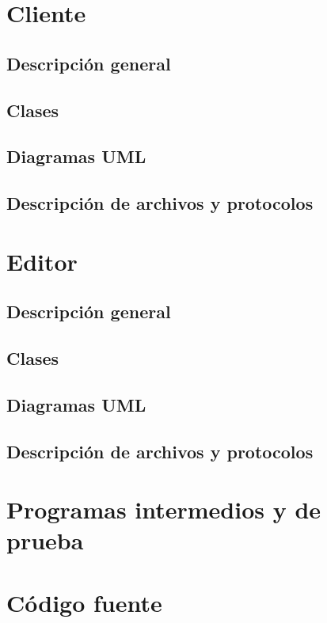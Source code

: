 \documentclass[a4paper]{article}
\begin{document}
\section{Cliente}

\subsection{Descripción general}

\subsection{Clases}

\subsection{Diagramas UML}

\subsection{Descripción de archivos y protocolos}

\section{Editor}

\subsection{Descripción general}

\subsection{Clases}

\subsection{Diagramas UML}

\subsection{Descripción de archivos y protocolos}

\section{Programas intermedios y de prueba}

\section{Código fuente}
\end{document}
